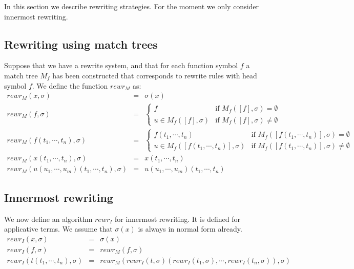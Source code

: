 \documentclass{article}
\begin{document}
In this section we describe rewriting strategies. For the moment we only
consider innermost rewriting.

\subsection{Rewriting using match trees}

Suppose that we have a rewrite system, and that for each function symbol $f$
a match tree $M_{f}$ has been constructed that corresponds to rewrite rules
with head symbol $f$. We define the function $rewr_{M}$ as:%
\begin{equation*}
\begin{array}{lll}
rewr_{M}(x,\sigma ) & = & \sigma (x) \\ 
rewr_{M}(f,\sigma ) & = & \left\{ 
\begin{array}{ll}
f & \text{if }M_{f}([f],\sigma )=\emptyset \\ 
u\in M_{f}([f],\sigma ) & \text{if }M_{f}([f],\sigma )\neq \emptyset%
\end{array}%
\right. \\ 
rewr_{M}(f(t_{1},\cdots ,t_{n}),\sigma ) & = & \left\{ 
\begin{array}{ll}
f(t_{1},\cdots ,t_{n}) & \text{if }M_{f}([f(t_{1},\cdots ,t_{n})],\sigma
)=\emptyset \\ 
u\in M_{f}([f(t_{1},\cdots ,t_{n})],\sigma ) & \text{if }M_{f}([f(t_{1},%
\cdots ,t_{n})],\sigma )\neq \emptyset%
\end{array}%
\right. \\ 
rewr_{M}(x(t_{1},\cdots ,t_{n}),\sigma ) & = & x(t_{1},\cdots ,t_{n}) \\ 
rewr_{M}(u(u_{1},\cdots ,u_{m})(t_{1},\cdots ,t_{n}),\sigma ) & = & 
u(u_{1},\cdots ,u_{m})(t_{1},\cdots ,t_{n})%
\end{array}%
\end{equation*}

\subsection{Innermost rewriting}

We now define an algorithm $rewr_{I}$ for innermost rewriting. It is defined
for applicative terms. We assume that $\sigma (x)$ is always in normal form
already.%
\begin{equation*}
\begin{array}{lll}
rewr_{I}(x,\sigma ) & = & \sigma (x) \\ 
rewr_{I}(f,\sigma ) & = & rewr_{M}(f,\sigma ) \\ 
rewr_{I}(t(t_{1},\cdots ,t_{n}),\sigma ) & = & rewr_{M}(rewr_{I}(t,\sigma
)(rewr_{I}(t_{1},\sigma ),\cdots ,rewr_{I}(t_{n},\sigma )),\sigma )%
\end{array}%
\end{equation*}
\end{document}
